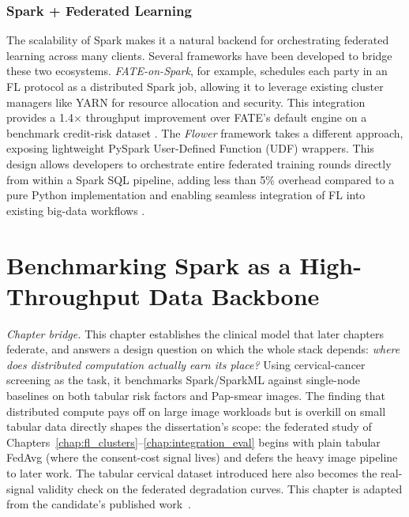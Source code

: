 \documentclass[12pt]{report}
\begin{document}
\subsection{Spark + Federated Learning}
The scalability of Spark makes it a natural backend for orchestrating federated learning across many clients. Several frameworks have been developed to bridge these two ecosystems. \emph{FATE-on-Spark}, for example, schedules each party in an FL protocol as a distributed Spark job, allowing it to leverage existing cluster managers like YARN for resource allocation and security. This integration provides a 1.4$\times$ throughput improvement over FATE's default engine on a benchmark credit-risk dataset \cite{FATE2023Spark}. The \emph{Flower} framework takes a different approach, exposing lightweight PySpark User-Defined Function (UDF) wrappers. This design allows developers to orchestrate entire federated training rounds directly from within a Spark SQL pipeline, adding less than 5\% overhead compared to a pure Python implementation and enabling seamless integration of FL into existing big-data workflows \cite{Beutel2020Flower}.



\chapter{Benchmarking Spark as a High-Throughput Data Backbone}\label{chap:spark}

\noindent\emph{Chapter bridge.} This chapter establishes the clinical model that
later chapters federate, and answers a design question on which the whole stack
depends: \emph{where does distributed computation actually earn its place?} Using
cervical-cancer screening as the task, it benchmarks Spark/SparkML against
single-node baselines on both tabular risk factors and Pap-smear images. The
finding that distributed compute pays off on large image workloads but is overkill
on small tabular data directly shapes the dissertation's scope: the federated
study of Chapters~\ref{chap:fl_clusters}--\ref{chap:integration_eval} begins with
plain tabular FedAvg (where the consent-cost signal lives) and defers the heavy
image pipeline to later work. The tabular cervical dataset introduced here also
becomes the real-signal validity check on the federated degradation curves. This
chapter is adapted from the candidate's published work~\cite{nhan2024cervical}.
\end{document}
